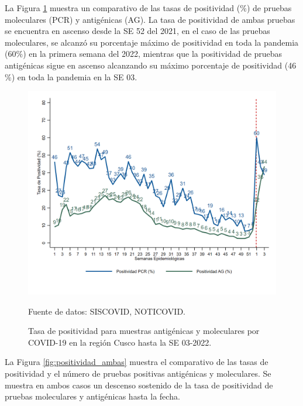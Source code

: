 \documentclass[12pt,a4paper,openany]{book}
\begin{document}
   La Figura \ref{fig:total_muestras_procesada} muestra un comparativo de las tasas de positividad ($\%$) de pruebas moleculares (PCR) y antigénicas (AG). La tasa de positividad de ambas pruebas se encuentra en ascenso desde la SE 52 del 2021, en el caso de las pruebas moleculares, se alcanzó su porcentaje máximo de positividad en toda la pandemia (60$\%$) en la primera semana del 2022, mientras que la positividad de pruebas antigénicas sigue en ascenso alcanzando su máximo porcentaje de positividad (46$\%$) en toda la pandemia en la SE 03. 
  
   \begin{figure}[h]
	\caption{Tasa de positividad para muestras antigénicas y moleculares por COVID-19 en la región Cusco hasta la SE 03-2022. }\label{fig:total_muestras_procesada}
	\begin{center}
		\includegraphics[width=0.80\linewidth]{../figuras/positividad_diaria_2021_2022.png}
	\end{center}
	{\footnotesize {Fuente de datos: SISCOVID, NOTICOVID.}}
\end{figure}


La Figura \ref{fig:positividad_ambas} muestra el comparativo de las tasas de positividad y el número de pruebas positivas antigénicas y moleculares. Se muestra en ambos casos un descenso sostenido de la tasa de positividad de pruebas moleculares y antigénicas hasta la fecha. 
\end{document}
